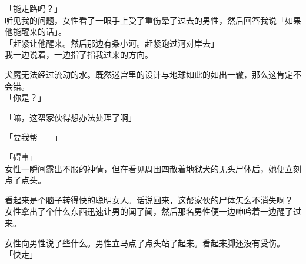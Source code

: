 「能走路吗？」\\

听见我的问题，女性看了一眼手上受了重伤晕了过去的男性，然后回答我说「如果他能醒来的话」。\\

「赶紧让他醒来。然后那边有条小河。赶紧跑过河对岸去」\\

我一边说着，一边指了指我过来的方向。

犬魔无法经过流动的水。既然迷宫里的设计与地球如此的如出一辙，那么这肯定不会错。\\

「你是？」

「嘛，这帮家伙得想办法处理了啊」

「要我帮——」

「碍事」\\

女性一瞬间露出不服的神情，但在看见周围四散着地狱犬的无头尸体后，她便立刻点了点头。

看起来是个脑子转得快的聪明女人。话说回来，这帮家伙的尸体怎么不消失啊？\\

女性拿出了个什么东西迅速让男的闻了闻，然后那名男性便一边呻吟着一边醒了过来。

女性向男性说了些什么。男性立马点了点头站了起来。看起来脚还没有受伤。\\

「快走」\\

